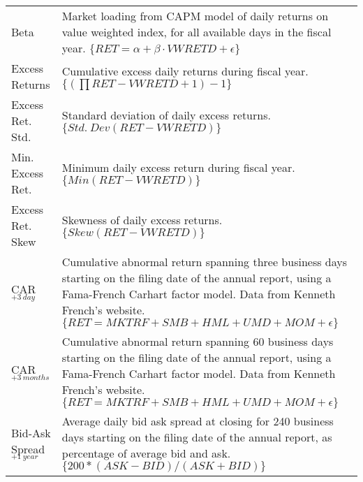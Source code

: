 {\begin{center}
\begin{longtable*}{l  >{\raggedright\let\newline\\\arraybackslash\hspace{0pt}}p{.7 \textwidth}}
		Beta  				& Market loading from CAPM model of daily returns on value weighted index, for all available days in the fiscal year. $ \{ RET = \alpha + \beta \cdot VWRETD + \epsilon \} $  \\ %
        Excess Returns  	& Cumulative excess daily returns during fiscal year. $ \{ (\prod RET - VWRETD + 1) - 1  \} $  \\ %
        Excess Ret. Std.	& Standard deviation of daily excess returns. $ \{ Std.\ Dev(RET- VWRETD)  \} $  \\ %
        Min. Excess Ret.	& Minimum daily excess return during fiscal year. $ \{ Min(RET- VWRETD)  \} $  \\ %
        Excess Ret. Skew	& Skewness of daily excess returns. $ \{ Skew(RET- VWRETD) \} $ \\ %
        CAR$_{+3\ day}$  	& Cumulative abnormal return spanning three business days starting on the filing date of the annual report, using a Fama-French Carhart factor model. Data from Kenneth French's website. $ \{ RET=MKTRF+SMB+HML+UMD+MOM+\epsilon \}$ \\ %
        CAR$_{+3\ months}$ 	& Cumulative abnormal return spanning 60 business days starting on the filing date of the annual report, using a Fama-French Carhart factor model. Data from Kenneth French's website. $ \{ RET=MKTRF+SMB+HML+UMD+MOM+\epsilon \}$ \\ %
		Bid-Ask Spread$_{+1\ year}$ & Average daily bid ask spread at closing for 240 business days starting on the filing date of the annual report, as percentage of average bid and ask. $\{ 200*(ASK - BID)/(ASK + BID) \}$ \\ %
		

\end{longtable*}
\end{center}}

